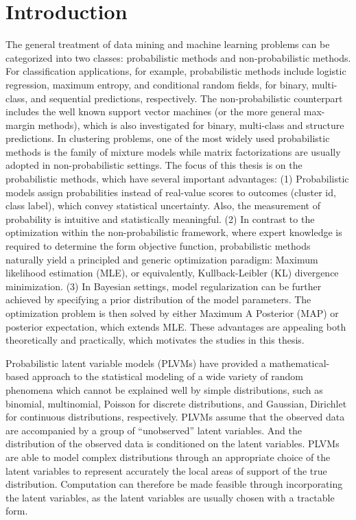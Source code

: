 \chapter{Introduction}

The general treatment of data mining and machine learning problems can be
categorized into two classes: probabilistic methods and non-probabilistic
methods. For classification applications, for example, probabilistic methods
include logistic regression, maximum entropy, and conditional random fields, for
binary, multi-class, and sequential predictions, respectively. The
non-probabilistic counterpart includes the well known support vector machines
(or the more general max-margin methods), which is also investigated for binary,
multi-class and structure predictions. In clustering problems, one of the most
widely used probabilistic methods is the family of mixture models while matrix
factorizations are usually adopted in non-probabilistic settings. The focus of
this thesis is on the probabilistic methods, which have several important
advantages: (1) Probabilistic models assign probabilities instead of real-value
scores to outcomes (cluster id, class label), which convey statistical
uncertainty. Also, the measurement of probability is intuitive and statistically
meaningful. (2) In contrast to the optimization within the non-probabilistic
framework, where expert knowledge is required to determine the form objective
function, probabilistic methods naturally yield a principled and generic
optimization paradigm: Maximum likelihood estimation (MLE), or equivalently,
Kullback-Leibler (KL) divergence minimization. (3) In Bayesian settings, model
regularization can be further achieved by specifying a prior distribution of the
model parameters. The optimization problem is then solved by either Maximum A
Posterior (MAP) or posterior expectation, which extends MLE. These advantages
are appealing both theoretically and practically, which motivates the studies in
this thesis.

Probabilistic latent variable models (PLVMs) have provided a mathematical-based
approach to the statistical modeling of a wide variety of random phenomena which
cannot be explained well by simple distributions, such as binomial, multinomial,
Poisson for discrete distributions, and Gaussian, Dirichlet for continuous
distributions, respectively. PLVMs assume that the observed data are accompanied
by a group of ``unobserved'' latent variables. And the distribution of the
observed data is conditioned on the latent variables. PLVMs are able to model
complex distributions through an appropriate choice of the latent variables to
represent accurately the local areas of support of the true distribution.
Computation can therefore be made feasible through incorporating the latent
variables, as the latent variables are usually chosen with a tractable form.

